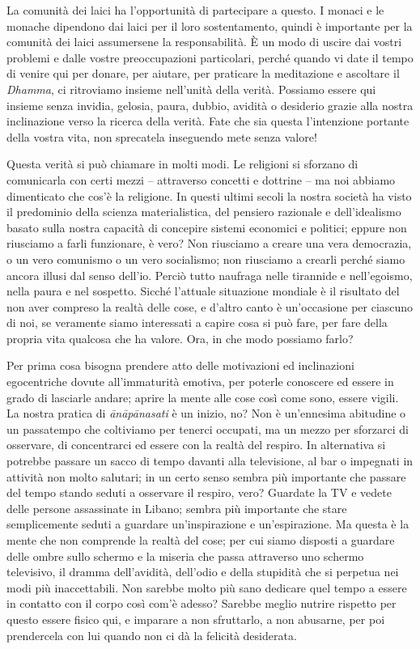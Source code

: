 La comunità dei laici ha l'opportunità di partecipare a questo. I monaci
e le monache dipendono dai laici per il loro sostentamento, quindi è
importante per la comunità dei laici assumersene la responsabilità. È
un modo di uscire dai vostri problemi e dalle vostre preoccupazioni
particolari, perché quando vi date il tempo di venire qui per donare,
per aiutare, per praticare la meditazione e ascoltare il \textit{Dhamma}, ci
ritroviamo insieme nell'unità della verità. Possiamo essere qui insieme
senza invidia, gelosia, paura, dubbio, avidità o desiderio grazie alla
nostra inclinazione verso la ricerca della verità. Fate che sia questa
l'intenzione portante della vostra vita, non sprecatela inseguendo mete
senza valore!

Questa verità si può chiamare in molti modi. Le religioni si sforzano di
comunicarla con certi mezzi – attraverso concetti e dottrine – ma noi
abbiamo dimenticato che cos'è la religione. In questi ultimi secoli la
nostra società ha visto il predominio della scienza materialistica, del
pensiero razionale e dell'idealismo basato sulla nostra capacità di
concepire sistemi economici e politici; eppure non riusciamo a farli
funzionare, è vero? Non riusciamo a creare una vera democrazia, o un
vero comunismo o un vero socialismo; non riusciamo a crearli perché
siamo ancora illusi dal senso dell'io. Perciò tutto naufraga nelle
tirannide e nell'egoismo, nella paura e nel sospetto. Sicché l'attuale
situazione mondiale è il risultato del non aver compreso la realtà delle
cose, e d'altro canto è un'occasione per ciascuno di noi, se veramente
siamo interessati a capire cosa si può fare, per fare della propria vita
qualcosa che ha valore. Ora, in che modo possiamo farlo?

Per prima cosa bisogna prendere atto delle motivazioni ed inclinazioni
egocentriche dovute all'immaturità emotiva, per poterle conoscere ed
essere in grado di lasciarle andare; aprire la mente alle cose così come
sono, essere vigili. La nostra pratica di \textit{ānāpānasati} è un inizio, no?
Non è un'ennesima abitudine o un passatempo che coltiviamo per tenerci
occupati, ma un mezzo per sforzarci di osservare, di concentrarci ed
essere con la realtà del respiro. In alternativa si potrebbe passare un
sacco di tempo davanti alla televisione, al bar o impegnati in attività
non molto salutari; in un certo senso sembra più importante che passare
del tempo stando seduti a osservare il respiro, vero? Guardate la TV e
vedete delle persone assassinate in Libano; sembra più importante che
stare semplicemente seduti a guardare un'inspirazione e un'espirazione.
Ma questa è la mente che non comprende la realtà del cose; per cui siamo
disposti a guardare delle ombre sullo schermo e la miseria che passa
attraverso uno schermo televisivo, il dramma dell'avidità, dell'odio e
della stupidità che si perpetua nei modi più inaccettabili. Non sarebbe
molto più sano dedicare quel tempo a essere in contatto con il corpo
così com'è adesso? Sarebbe meglio nutrire rispetto per questo essere
fisico qui, e imparare a non sfruttarlo, a non abusarne, per poi
prendercela con lui quando non ci dà la felicità desiderata.

